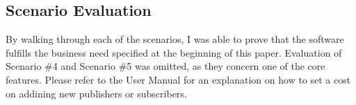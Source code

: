 \subsection{Scenario Evaluation}
By walking through each of the scenarios, I was able to prove that the software fulfills the business need specified at the beginning of this paper. Evaluation of Scenario \#4 and Scenario \#5 was omitted, as they concern one of the core features. Please refer to the User Manual for an explanation on how to set a cost on addining new publishers or subscribers.